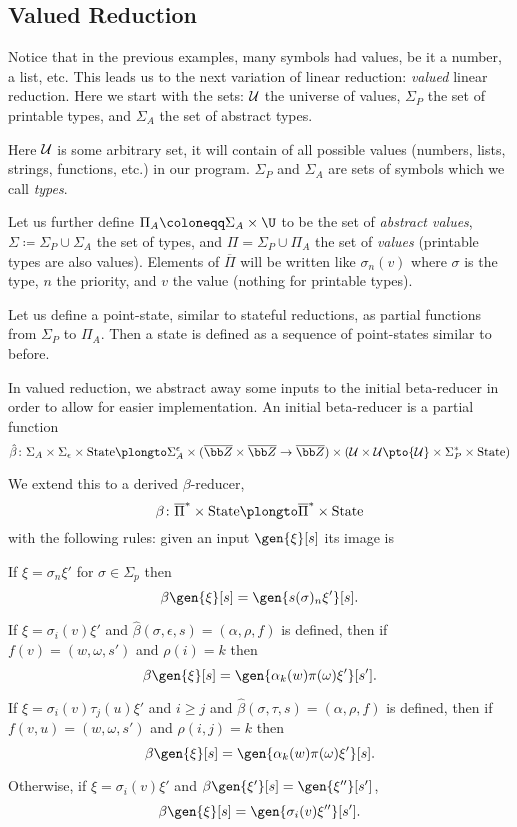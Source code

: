 \subsection{Valued Reduction}

Notice that in the previous examples, many symbols had values, be it a number, a list, etc.
This leads us to the next variation of linear reduction: {\it valued} linear reduction.
Here we start with the sets: ${\cal U}$ the universe of values, $\Sigma_P$ the set of printable types, and $\Sigma_A$ the set of abstract types.

Here ${\cal U}$ is some arbitrary set, it will contain of all possible values (numbers, lists, strings, functions, etc.) in our program.
$\Sigma_P$ and $\Sigma_A$ are sets of symbols which we call {\it types}.

Let us further define $\Pi_A\coloneqq\Sigma_A\times\U$ to be the set of {\it abstract values}, $\Sigma\coloneqq\Sigma_P\cup\Sigma_A$ the set of types, and $\Pi=\Sigma_P\cup\Pi_A$ the set of {\it values}
(printable types are also values).
Elements of $\overline\Pi$ will be written like $\sigma_n(v)$ where $\sigma$ is the type, $n$ the priority, and $v$ the value (nothing for printable types).

Let us define a point-state, similar to stateful reductions, as partial functions from $\Sigma_P$ to $\Pi_A$.
Then a state is defined as a sequence of point-states similar to before.

In valued reduction, we abstract away some inputs to the initial beta-reducer in order to allow for easier implementation.
An initial beta-reducer is a partial function
$$ \hat\beta\colon \Sigma_A\times\Sigma_\epsilon\times{\rm State}\plongto\Sigma_A^\epsilon\times(\overline{\bb Z}\times\overline{\bb Z}\to\overline{\bb Z})\times
({\cal U}\times{\cal U}\pto{\cal U}\times\Sigma_P^*\times{\rm State}) $$

We extend this to a derived $\beta$-reducer,
$$ \beta\colon\overline\Pi^*\times{\rm State}\plongto\overline\Pi^*\times{\rm State} $$
with the following rules: given an input $\gen{\xi}[s]$ its image is
\benum
    \item If $\xi=\sigma_n\xi'$ for $\sigma\in\Sigma_p$ then
        $$ \beta\gen{\xi}[s] = \gen{s(\sigma)_n\xi'}[s] . $$
    \item If $\xi=\sigma_i(v)\xi'$ and $\hat\beta(\sigma,\epsilon,s)=(\alpha,\rho,f)$ is defined, then if $f(v)=(w,\omega,s')$ and $\rho(i)=k$ then
        $$ \beta\gen{\xi}[s] = \gen{\alpha_k(w)\pi(\omega)\xi'}[s'] . $$
    \item If $\xi=\sigma_i(v)\tau_j(u)\xi'$ and $i\geq j$ and $\hat\beta(\sigma,\tau,s)=(\alpha,\rho,f)$ is defined, then if $f(v,u)=(w,\omega,s')$ and $\rho(i,j)=k$ then
        $$ \beta\gen{\xi}[s] = \gen{\alpha_k(w)\pi(\omega)\xi'}[s] . $$
    \item Otherwise, if $\xi=\sigma_i(v)\xi'$ and $\beta\gen{\xi'}[s]=\gen{\xi''}[s']$,
        $$ \beta\gen{\xi}[s] = \gen{\sigma_i(v)\xi''}[s'] . $$
\eenum

